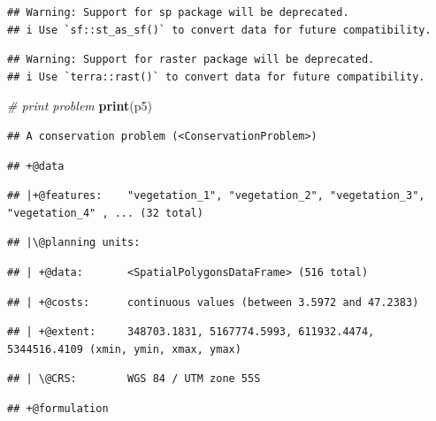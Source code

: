 \documentclass[12pt,]{book}
\newenvironment{Shaded}{\begin{snugshade}}{\end{snugshade}}
\newcommand{\CommentTok}[1]{\textcolor[rgb]{0.56,0.35,0.01}{\textit{#1}}}
\newcommand{\KeywordTok}[1]{\textcolor[rgb]{0.13,0.29,0.53}{\textbf{#1}}}
\newcommand{\NormalTok}[1]{#1}
\begin{document}
\begin{verbatim}
## Warning: Support for sp package will be deprecated.
## i Use `sf::st_as_sf()` to convert data for future compatibility.
\end{verbatim}

\begin{verbatim}
## Warning: Support for raster package will be deprecated.
## i Use `terra::rast()` to convert data for future compatibility.
\end{verbatim}

\begin{Shaded}
\begin{Highlighting}[]
\CommentTok{# print problem}
\KeywordTok{print}\NormalTok{(p5)}
\end{Highlighting}
\end{Shaded}

\begin{verbatim}
## A conservation problem (<ConservationProblem>)
\end{verbatim}

\begin{verbatim}
## +@data
\end{verbatim}

\begin{verbatim}
## |+@features:    "vegetation_1", "vegetation_2", "vegetation_3", "vegetation_4" , ... (32 total)
\end{verbatim}

\begin{verbatim}
## |\@planning units:
\end{verbatim}

\begin{verbatim}
## | +@data:       <SpatialPolygonsDataFrame> (516 total)
\end{verbatim}

\begin{verbatim}
## | +@costs:      continuous values (between 3.5972 and 47.2383)
\end{verbatim}

\begin{verbatim}
## | +@extent:     348703.1831, 5167774.5993, 611932.4474, 5344516.4109 (xmin, ymin, xmax, ymax)
\end{verbatim}

\begin{verbatim}
## | \@CRS:        WGS 84 / UTM zone 55S
\end{verbatim}

\begin{verbatim}
## +@formulation
\end{verbatim}
\end{document}
